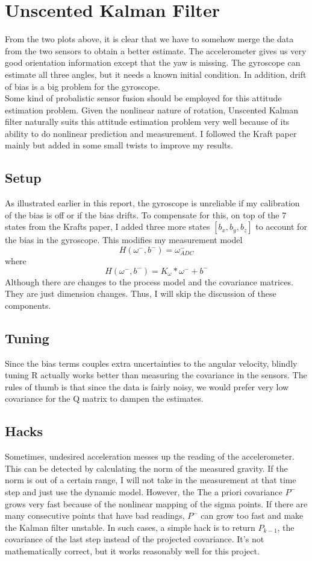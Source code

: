\documentclass[english]{article}
\begin{document}
\section*{Unscented Kalman Filter}
From the two plots above, it is clear that we have to somehow merge the data from the two sensors to obtain a better estimate. The accelerometer gives us very good orientation information except that the yaw is missing. The gyroscope can estimate all three angles, but it needs a known initial condition. In addition, drift of bias is a big problem for the gyroscope.\\
Some kind of probalistic sensor fusion should be employed for this attitude estimation problem. Given the nonlinear nature of rotation, Unscented Kalman filter naturally suits this attitude estimation problem very well because of its ability to do nonlinear prediction and measurement. I followed the Kraft paper mainly but added in some small twists to improve my results.
\subsection*{Setup}
As illustrated earlier in this report, the gyroscope is unreliable if my calibration of the bias is off or if the bias drifts. To compensate for this, on top of the 7 states from the Krafts paper, I added three more states $[b_x, b_y, b_z]$ to account for the bias in the gyroscope. This modifies my measurement model
\[H(\omega^-, b^-) = \omega_{ADC}^-\]
where
\[H(\omega^-, b^-) = K_{\omega}*\omega^- + b^-\]
Although there are changes to the process model and the covariance matrices. They are just dimension changes. Thus, I will skip the discussion of these components.
\subsection*{Tuning}
Since the bias terms couples extra uncertainties to the angular velocity, blindly tuning R actually works better than measuring the covariance in the sensors. The rules of thumb is that since the data is fairly noisy, we would prefer very low covariance for the Q matrix to dampen the estimates.
\subsection*{Hacks}
Sometimes, undesired acceleration messes up the reading of the accelerometer. This can be detected by calculating the norm of the measured gravity. If the norm is out of a certain range, I will not take in the measurement at that time step and just use the dynamic model. However, the The a priori covariance $P^-$ grows very fast because of the nonlinear mapping of the sigma points. If there are many consecutive points that have bad readings, $P^-$ can grow too fast and make the Kalman filter unstable. In such cases, a simple hack is to return $P_{k-1}$, the covariance of the last step instead of the projected covariance. It's not mathematically correct, but it works reasonably well for this project.
\end{document}
